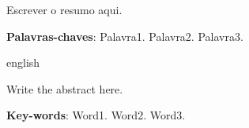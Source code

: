 \setlength{\absparsep}{18pt} %
                     
\begin{resumo}

Escrever o resumo aqui.

\textbf{Palavras-chaves}: Palavra1. Palavra2. Palavra3.

\end{resumo}


\begin{resumo}[Abstract]
 \begin{otherlanguage*}{english}

Write the abstract here.

\textbf{Key-words}: Word1. Word2. Word3.

 \end{otherlanguage*}
\end{resumo}

